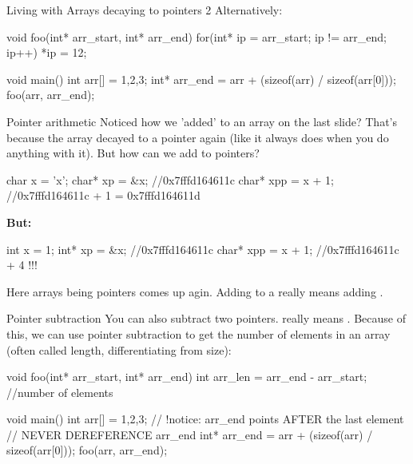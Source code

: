\documentclass[10pt,graphics,aspectratio=169,table]{beamer}
\begin{document}
\begin{frame}[fragile]{Living with Arrays decaying to pointers 2}
    Alternatively:
    \begin{codeblock} 
void foo(int* arr_start, int* arr_end){ 
    for(int* ip = arr_start; ip != arr_end; ip++){
        *ip = 12;
    }
}

void main(){
    int arr[] = {1,2,3};
    int* arr_end = arr + (sizeof(arr) / sizeof(arr[0]));
    foo(arr, arr_end);
}
    \end{codeblock} 

\end{frame}

\begin{frame}[fragile]{Pointer arithmetic}
    Noticed how we 'added' to an array on the last slide?
    That's because the array decayed to a pointer again 
    (like it always does when you do anything with it).
    But how can we add to pointers?
    \begin{codeblock} 
char x = 'x';
char* xp = &x; //0x7fffd164611c
char* xpp = x + 1;  //0x7fffd164611c + 1 = 0x7fffd164611d
    \end{codeblock} 

    \textbf{But:} 
    \begin{codeblock} 
int x = 1;
int* xp = &x; //0x7fffd164611c
char* xpp = x + 1;  //0x7fffd164611c + 4  !!!
    \end{codeblock}

    Here arrays being pointers comes up agin. 
    Adding  to a  really means adding .
\end{frame}

\begin{frame}[fragile]{Pointer subtraction}
    You can also subtract two pointers. 
     really means .
    Because of this, we can use pointer subtraction 
    to get the number of elements in an array 
    (often called length, differentiating from size):
    \begin{codeblock} 
void foo(int* arr_start, int* arr_end){ 
   int arr_len = arr_end  - arr_start; //number of elements
}
        
void main(){
    int arr[] = {1,2,3};
    // !notice: arr_end points AFTER the last element
    // NEVER DEREFERENCE arr_end
    int* arr_end = arr + (sizeof(arr) / sizeof(arr[0]));
    foo(arr, arr_end);
}
    \end{codeblock} 
        
\end{frame}

\end{document}
